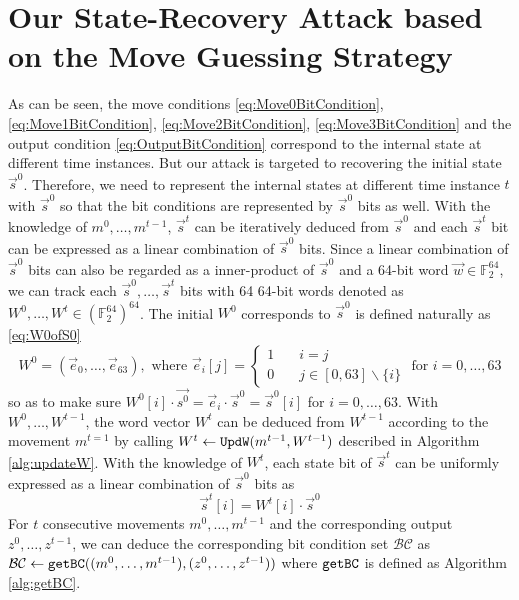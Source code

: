 \section{Our State-Recovery Attack based on the Move Guessing Strategy}\label{sec:OurGuessAndDetermine}
As can be seen, the move conditions \eqref{eq:Move0BitCondition}, \eqref{eq:Move1BitCondition}, \eqref{eq:Move2BitCondition}, \eqref{eq:Move3BitCondition} and the output condition \eqref{eq:OutputBitCondition} correspond to the internal state at different time instances.
But our attack is targeted to recovering the initial state $\vec{s}^0$.
Therefore, we need to represent the internal states at different time instance $t$ with $\vec{s}^0$ so that the bit conditions are represented by $\vec{s}^0$ bits as well.
With the knowledge of $m^0,\ldots, m^{t-1}$, $\vec{s}^{t}$ can be iteratively deduced from $\vec{s}^{0}$ and each $\vec{s}^{t}$ bit can be expressed as a linear combination of $\vec{s}^0$ bits.
Since a linear combination of $\vec{s}^0$ bits can also be regarded as a inner-product of $\vec{s}^0$ and a 64-bit word $\vec w\in \mathbb{F}_2^{64}$, we can track each $\vec{s}^0,\ldots, \vec{s}^t$ bits with 64 64-bit words denoted as $W^0,\ldots, W^t\in (\mathbb{F}_2^{64})^{64}$.
The initial $W^0$ corresponds to $\vec{s}^0$ is defined naturally as \eqref{eq:W0ofS0}
\begin{equation}\label{eq:W0ofS0}
  W^0=(\vec e_0, \ldots, \vec e_{63}), \text{ where } \vec e_i[j]=\left\{
  \begin{split}
     1 &\quad i=j \\
     0 &\quad j\in [0,63]\backslash\{i\}
  \end{split}
  \right.\text{ for }i=0,\ldots, 63
\end{equation}
so as to make sure $W^0[i]\cdot \vec{s^0}=\vec{e}_i\cdot \vec{s}^0=\vec{s}^0[i]$ for $i=0,\ldots, 63$.
With $W^0,\ldots, W^{t-1}$, the word vector $W^{t}$ can be deduced from $W^{t-1}$ according to the movement $m^{t=1}$ by calling
$W^{t}\leftarrow {\tt UpdW}(m^{t-1}, W^{t-1})$ described in Algorithm \ref{alg:updateW}.
With the knowledge of $W^t$, each state bit of $\vec{s}^t$ can be uniformly expressed as a linear combination of $\vec{s}^0$ bits as
\begin{equation}\label{eq:ExpressStwithS0}
\vec{s}^t[i]=W^t[i]\cdot \vec{s}^0
\end{equation}
For $t$ consecutive movements $m^0,\ldots,m^{t-1}$ and the corresponding output $z^0,\ldots, z^{t-1}$, we can deduce the corresponding bit condition set $\mathcal{BC}$ as $\mathcal{BC}\leftarrow {\tt{getBC}}((m^0,\ldots, m^{t-1}), (z^0,\ldots, z^{t-1}))$ where ${\tt{getBC}}$ is defined as Algorithm \ref{alg:getBC}.
